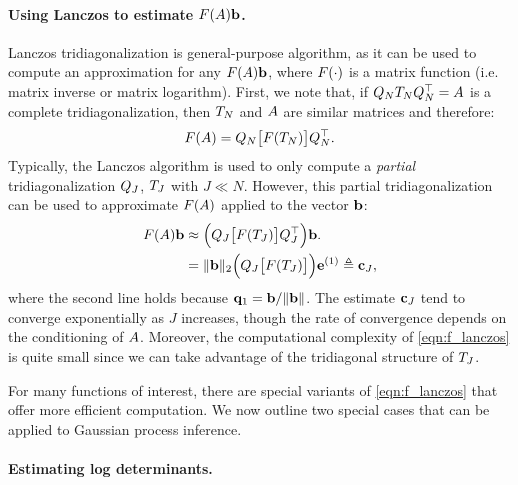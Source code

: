 \paragraph{Using Lanczos to estimate $F (A) \mathbf{b}$.}
Lanczos tridiagonalization is general-purpose algorithm, as it can be used to compute an approximation for any $F(A) \mathbf{b}$, where $F( \cdot )$ is a matrix function (i.e. matrix inverse or matrix logarithm).
First, we note that, if $Q_N T_N Q_N^\top = A$ is a complete tridiagonalization, then $T_N$ and $A$ are similar matrices and therefore:
\begin{equation}
  F ( A ) = Q_N \bigl[ F ( T_N ) \bigr] Q_N^\top.
  \label{eqn:f_tridiagonal}
\end{equation}
%
%
Typically, the Lanczos algorithm is used to only compute a \emph{partial} tridiagonalization $Q_J$, $T_J$ with $J \ll N$.
However, this partial tridiagonalization can be used to approximate $F ( A )$ applied to the vector $\mathbf{b}$:
%
\begin{align}
  F ( A ) \mathbf{b}
  &\approx \Bigl( Q_J \bigl[ F ( T_J ) \bigr] Q_J^\top \Bigr) \mathbf{b}.
  \nonumber \\
  &= \Vert \mathbf{b} \Vert_2 \Bigl( Q_J \bigl[ F ( T_J ) \bigr] \Bigr) \mathbf{e}^{(1)}
  \triangleq \mathbf{c}_J,
  \label{eqn:f_lanczos}
\end{align}
%
where the second line holds because $\mathbf{q}_1 = \mathbf{b} / \Vert \mathbf{b} \Vert$.
The estimate $\mathbf{c}_J$ tend to converge exponentially as $J$ increases, though the rate of convergence depends on the conditioning of $A$.
Moreover, the computational complexity of \cref{eqn:f_lanczos} is quite small since we can take advantage of the tridiagonal structure of $T_J$.

For many functions of interest, there are special variants of \cref{eqn:f_lanczos} that offer more efficient computation.
We now outline two special cases that can be applied to Gaussian process inference.

\paragraph{Estimating log determinants.}

